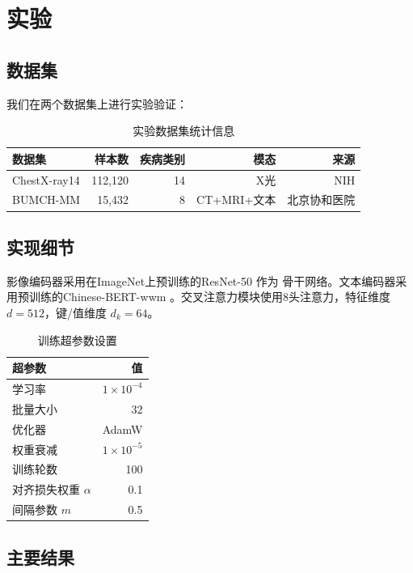 \documentclass[12pt,a4paper]{article}
\theoremstyle{definition}
\begin{document}
\section{实验}

\subsection{数据集}

我们在两个数据集上进行实验验证：

\begin{table}[H]
\centering
\caption{实验数据集统计信息}\label{tab:datasets}
\begin{tabular}{@{}lrrrr@{}}
\toprule
数据集 & 样本数 & 疾病类别 & 模态 & 来源 \\
\midrule
ChestX-ray14 & 112,120 & 14 & X光 & NIH \\
BUMCH-MM & 15,432 & 8 & CT+MRI+文本 & 北京协和医院 \\
\bottomrule
\end{tabular}
\end{table}

\subsection{实现细节}

影像编码器采用在ImageNet上预训练的ResNet-50 \cite{he2016deep}作为
骨干网络。文本编码器采用预训练的Chinese-BERT-wwm
\cite{cui2020revisiting}。交叉注意力模块使用8头注意力，特征维度
$d = 512$，键/值维度 $d_k = 64$。

\begin{table}[H]
\centering
\caption{训练超参数设置}\label{tab:hyperparams}
\begin{tabular}{@{}lr@{}}
\toprule
超参数 & 值 \\
\midrule
学习率 & $1 \times 10^{-4}$ \\
批量大小 & 32 \\
优化器 & AdamW \\
权重衰减 & $1 \times 10^{-5}$ \\
训练轮数 & 100 \\
对齐损失权重 $\alpha$ & 0.1 \\
间隔参数 $m$ & 0.5 \\
\bottomrule
\end{tabular}
\end{table}

\subsection{主要结果}
\end{document}
